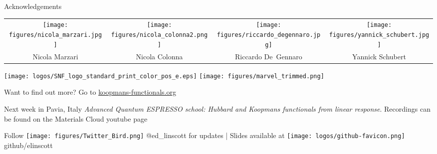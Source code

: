 \documentclass[xcolor=table,aspectratio=169]{beamer}
\numberwithin{equation}{section}
\begin{document}
\begin{frame}{Acknowledgements}
   \begin{center}
      \footnotesize
      \begin{tabularx}{\textwidth}{CCCC}
         \texttt{[image: figures/nicola\_marzari.jpg]}     &
         \texttt{[image: figures/nicola\_colonna2.png]}    &
         \texttt{[image: figures/riccardo\_degennaro.jpg]} &
         \texttt{[image: figures/yannick\_schubert.jpg]}     \\
         Nicola Marzari                                                             &
         Nicola Colonna                                                             &
         Riccardo De~Gennaro                                                        &
         Yannick Schubert                                                             \\
      \end{tabularx}
   \end{center}
   \begin{center}
      \texttt{[image: logos/SNF\_logo\_standard\_print\_color\_pos\_e.eps]}
      \hspace{1em}
      \texttt{[image: figures/marvel\_trimmed.png]}
   \end{center}

   \begin{center}
      \vspace{1em}
      \small
      Want to find out more? Go to \url{koopmans-functionals.org}
      \vspace{1em}

      Next week in Pavia, Italy \emph{Advanced Quantum ESPRESSO school: Hubbard and Koopmans functionals from linear response}. Recordings can be found on the Materials Cloud youtube page
      \vspace{1em}

      Follow \texttt{[image: figures/Twitter\_Bird.png]} \textcolor{twitter_blue}{@ed\_linscott} for updates | Slides available at \texttt{[image: logos/github-favicon.png]} github/elinscott
   \end{center}

   \vspace{2ex}
   \scriptsize


   \vspace{2ex}
   \scriptsize
\end{frame}
\end{document}
